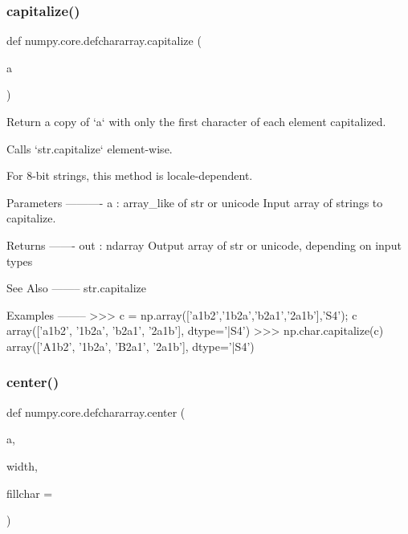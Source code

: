 \subsubsection{\texorpdfstring{capitalize()}{capitalize()}}
{\footnotesize\ttfamily def numpy.\+core.\+defchararray.\+capitalize (\begin{DoxyParamCaption}\item[{}]{a }\end{DoxyParamCaption})}

\begin{DoxyVerb}Return a copy of `a` with only the first character of each element
capitalized.

Calls `str.capitalize` element-wise.

For 8-bit strings, this method is locale-dependent.

Parameters
----------
a : array_like of str or unicode
    Input array of strings to capitalize.

Returns
-------
out : ndarray
    Output array of str or unicode, depending on input
    types

See Also
--------
str.capitalize

Examples
--------
>>> c = np.array(['a1b2','1b2a','b2a1','2a1b'],'S4'); c
array(['a1b2', '1b2a', 'b2a1', '2a1b'],
    dtype='|S4')
>>> np.char.capitalize(c)
array(['A1b2', '1b2a', 'B2a1', '2a1b'],
    dtype='|S4')\end{DoxyVerb}
 \mbox{\label{namespacenumpy_1_1core_1_1defchararray_a1eebc98d29a1d099419792332efcabd8}} 
\subsubsection{\texorpdfstring{center()}{center()}}
{\footnotesize\ttfamily def numpy.\+core.\+defchararray.\+center (\begin{DoxyParamCaption}\item[{}]{a,  }\item[{}]{width,  }\item[{}]{fillchar = {\ttfamily \textquotesingle{}~\textquotesingle{}} }\end{DoxyParamCaption})}

